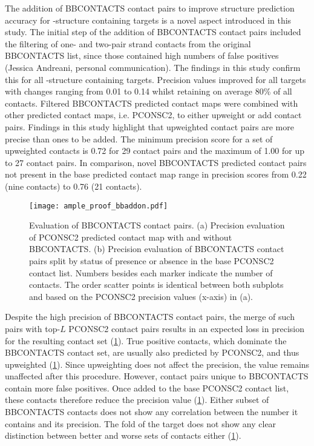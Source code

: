 The addition of BBCONTACTS contact pairs to improve structure prediction accuracy for \textbeta-structure containing targets is a novel aspect introduced in this study. The initial step of the addition of BBCONTACTS contact pairs included the filtering of one- and two-pair strand contacts from the original BBCONTACTS list, since those contained high numbers of false positives (Jessica Andreani, personal communication). The findings in this study confirm this for all \textbeta-structure containing targets. Precision values improved for all targets with changes ranging from 0.01 to 0.14 whilst retaining on average 80\% of all contacts. Filtered BBCONTACTS predicted contact maps were combined with other predicted contact maps, i.e. PCONSC2, to either upweight or add contact pairs. Findings in this study highlight that upweighted contact pairs are more precise than ones to be added. The minimum precision score for a set of upweighted contacts is 0.72 for 29 contact pairs and the maximum of 1.00 for up to 27 contact pairs. In comparison, novel BBCONTACTS predicted contact pairs not present in the base predicted contact map range in precision scores from 0.22 (nine contacts) to 0.76 (21 contacts). 

\begin{figure}[H]
    \centering
    \texttt{[image: ample\_proof\_bbaddon.pdf]}
    \caption[Evaluation of BBCONTACTS contact pairs]{Evaluation of BBCONTACTS contact pairs. (a) Precision evaluation of PCONSC2 predicted contact map with and without BBCONTACTS. (b) Precision evaluation of BBCONTACTS contact pairs split by status of presence or absence in the base PCONSC2 contact list. Numbers besides each marker indicate the number of contacts. The order scatter points is identical between both subplots and based on the PCONSC2 precision values (x-axis) in (a).}
    \label{fig:ample_proof_bbaddon}
\end{figure}

Despite the high precision of BBCONTACTS contact pairs, the merge of such pairs with top-$L$ PCONSC2 contact pairs results in an expected loss in precision for the resulting contact set (\cref{fig:ample_proof_bbaddon}). True positive contacts, which dominate the BBCONTACTS contact set, are usually also predicted by PCONSC2, and thus upweighted (\cref{fig:ample_proof_bbaddon}). Since upweighting does not affect the precision, the value remains unaffected after this procedure. However, contact pairs unique to BBCONTACTS contain more false positives. Once added to the base PCONSC2 contact list, these contacts therefore reduce the precision value (\cref{fig:ample_proof_bbaddon}). Either subset of BBCONTACTS contacts does not show any correlation between the number it contains and its precision. The fold of the target does not show any clear distinction between better and worse sets of contacts either (\cref{fig:ample_proof_bbaddon}).


